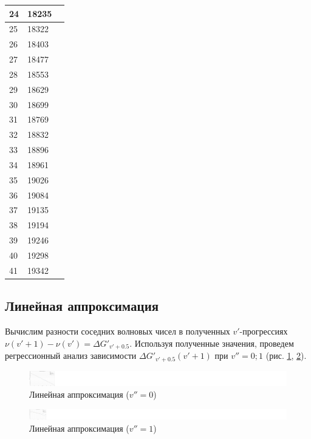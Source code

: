 \begin{longtable}[h!]{|p{1cm}|p{3cm}|p{3cm}|}
	\hline
	24 & 18235 &  \bigstrut\\
	\hline
	25 & 18322 &  \bigstrut\\
	\hline
	26 & 18403 &  \bigstrut\\
	\hline
	27 & 18477 &  \bigstrut\\
	\hline
	28 & 18553 &  \bigstrut\\
	\hline
	29 & 18629 &  \bigstrut\\
	\hline
	30 & 18699 &  \bigstrut\\
	\hline
	31 & 18769 &  \bigstrut\\
	\hline
	32 & 18832 &  \bigstrut\\
	\hline
	33 & 18896 &  \bigstrut\\
	\hline
	34 & 18961 &  \bigstrut\\
	\hline
	35 & 19026 &  \bigstrut\\
	\hline
	36 & 19084 &  \bigstrut\\
	\hline
	37 & 19135 &  \bigstrut\\
	\hline
	38 & 19194 &  \bigstrut\\
	\hline
	39 & 19246 &  \bigstrut\\
	\hline
	40 & 19298 &  \bigstrut\\
	\hline
	41 & 19342 &  \bigstrut\\
	\hline
\end{longtable}
\subsection{Линейная аппроксимация}
Вычислим разности соседних волновых чисел в полученных $v'$-прогрессиях \\$\nu(v'+1)-\nu(v')= \Delta G'_{v'+0.5}$. Используя полученные значения, проведем регрессионный анализ зависимости $\Delta G'_{v'+0.5}(v'+1)$ при $v'' = 0; 1$ (рис. \ref{deltaG0}, \ref{deltaG1}).

\begin{figure}[h!]
	\centering
	\includegraphics[width=0.81\linewidth]{data/deltaG(v_0).pdf}
	\caption{Линейная аппроксимация ($v''=0$)}
	\label{deltaG0}
\end{figure}
\begin{figure}[h!]
	\centering
	\includegraphics[width=0.79\linewidth]{data/deltaG(v_1).pdf}
	\caption{Линейная аппроксимация ($v''=1$)}
	\label{deltaG1}
\end{figure}

